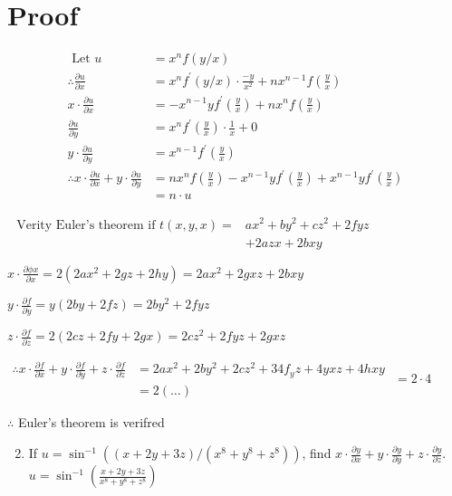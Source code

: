\documentclass[12pt, a4paper]{article}
\begin{document}
\section*{Proof}
$$
\begin{aligned}
\text { Let } u & =x^{n} f(y / x) \\
\therefore \frac{\partial u}{\partial x} & =x^{n} f^{\prime}(y / x) \cdot \frac{-y}{x^{2}}+n x^{n-1} f\left(\frac{y}{x}\right) \\
x \cdot \frac{\partial u}{\partial x} & =-x^{n-1} y f^{\prime}\left(\frac{y}{x}\right)+n x^{n} f\left(\frac{y}{x}\right) \\
\frac{\partial u}{\partial y} & =x^{n} f^{\prime}\left(\frac{y}{x}\right) \cdot \frac{1}{x}+0 \\
y \cdot \frac{\partial u}{\partial y} & =x^{n-1} f^{\prime}\left(\frac{y}{x}\right) \\
\therefore x \cdot \frac{\partial u}{\partial x}+y \cdot \frac{\partial u}{\partial y} & =n x^{n} f\left(\frac{y}{x}\right)-x^{n-1} y f^{\prime}\left(\frac{y}{x}\right)+x^{n-1} y f^{\prime}\left(\frac{y}{x}\right) \\
& =n \cdot u
\end{aligned}
$$

$\begin{aligned} \text { Verity Euler's theorem if } t(x, y, x)= & a x^{2}+b y^{2}+c z^{2}+2 f y z \\ & +2 a z x+2 b x y\end{aligned}$

$x \cdot \frac{\partial \phi x}{\partial x}=2\left(2 a x^{2}+2 g z+2 h y\right)=2 a x^{2}+2 g x z+2 b x y$

$y \cdot \frac{\partial f}{\partial y}=y(2 b y+2 f z)=2 b y^{2}+2 f y z$

$z \cdot \frac{\partial f}{\partial z}=2(2 c z+2 f y+2 g x)=2 c z^{2}+2 f y z+2 g x z$

$\begin{aligned} \therefore x \cdot \frac{\partial f}{\partial x}+y \cdot \frac{\partial f}{\partial y}+z \cdot \frac{\partial f}{\partial z} & =2 a x^{2}+2 b y^{2}+2 c z^{2}+34 f_{y} z+4 y x z+4 h x y \\ & =2(\ldots)\end{aligned}$ $=2 \cdot 4$

$\therefore$ Euler's theorem is verifred

\begin{enumerate}
  \setcounter{enumi}{1}
  \item If $u=\sin ^{-1}\left((x+2 y+3 z) /\left(x^{8}+y^{8}+z^{8}\right)\right)$, find $x \cdot \frac{\partial y}{\partial x}+y \cdot \frac{\partial y}{\partial y}+z \cdot \frac{\partial y}{\partial z}$. $u=\sin ^{-1}\left(\frac{x+2 y+3 z}{x^{8}+y^{8}+z^{8}}\right)$
\end{enumerate}
\end{document}
